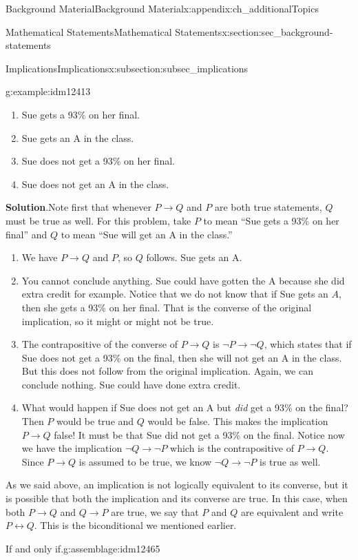 \documentclass[oneside,10pt,]{book}
\numberwithin{equation}{chapter}
\def\iff{\leftrightarrow}
\def\imp{\rightarrow}
\begin{document}
\begin{appendixptx}{Background Material}{}{Background Material}{}{}{x:appendix:ch_additionalTopics}
\begin{sectionptx}{Mathematical Statements}{}{Mathematical Statements}{}{}{x:section:sec_background-statements}
\begin{subsectionptx}{Implications}{}{Implications}{}{}{x:subsection:subsec_implications}
\begin{example}{}{g:example:idm12413}
\begin{enumerate}
\item{}Sue gets a 93\% on her final.%
\item{}Sue gets an A in the class.%
\item{}Sue does not get a 93\% on her final.%
\item{}Sue does not get an A in the class.%
\end{enumerate}
%
\par\smallskip%
\noindent\textbf{Solution}.\hypertarget{g:solution:idm12426}{}\quad{}Note first that whenever \(P \imp Q\) and \(P\) are both true statements, \(Q\) must be true as well. For this problem, take \(P\) to mean ``Sue gets a 93\% on her final'' and \(Q\) to mean ``Sue will get an A in the class.''%
\par
%
\begin{enumerate}
\item{}We have \(P \imp Q\) and \(P\), so \(Q\) follows. Sue gets an A.%
\item{}You cannot conclude anything. Sue could have gotten the A because she did extra credit for example. Notice that we do not know that if Sue gets an \(A\), then she gets a 93\% on her final. That is the converse of the original implication, so it might or might not be true.%
\item{}The contrapositive of the converse of \(P \imp Q\) is \(\neg P \imp \neg Q\), which states that if Sue does not get a 93\% on the final, then she will not get an A in the class. But this does not follow from the original implication. Again, we can conclude nothing. Sue could have done extra credit.%
\item{}What would happen if Sue does not get an A but \emph{did} get a 93\% on the final? Then \(P\) would be true and \(Q\) would be false. This makes the implication \(P \imp Q\) false! It must be that Sue did not get a 93\% on the final. Notice now we have the implication \(\neg Q \imp \neg P\) which is the contrapositive of \(P \imp Q\). Since \(P \imp Q\) is assumed to be true, we know \(\neg Q \imp \neg P\) is true as well.%
\end{enumerate}
%
\end{example}
As we said above, an implication is not logically equivalent to its converse, but it is possible that both the implication and its converse are true. In this case, when both \(P \imp Q\) and \(Q \imp P\) are true, we say that \(P\) and \(Q\) are equivalent and write \(P \iff Q\). This is the biconditional we mentioned earlier.%
\begin{assemblage}{If and only if.}{g:assemblage:idm12465}%

\end{assemblage}
\end{subsectionptx}
\end{sectionptx}
\end{appendixptx}
\end{document}
